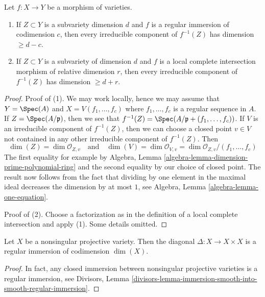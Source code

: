 \begin{lemma}
\label{lemma-pullback-by-regular-immersion}
Let $f : X \to Y$ be a morphism of varieties.
\begin{enumerate}
\item If $Z \subset Y$ is a subvariety dimension $d$ and $f$ is a regular
immersion of codimension $c$, then every irreducible component
of $f^{-1}(Z)$ has dimension $\geq d - c$.
\item If $Z \subset Y$ is a subvariety of dimension $d$ and
$f$ is a local complete intersection morphism of relative dimension $r$,
then every irreducible component of $f^{-1}(Z)$ has dimension $\geq d + r$.
\end{enumerate}
\end{lemma}

\begin{proof}
Proof of (1). We may work locally, hence we may assume that
$Y = \Spec(A)$ and $X = V(f_1, \ldots, f_c)$ where $f_1, \ldots, f_c$
is a regular sequence in $A$. If $Z = \Spec(A/\mathfrak p)$, then
we see that $f^{-1}(Z) = \Spec(A/\mathfrak p + (f_1, \ldots, f_c))$.
If $V$ is an irreducible component of $f^{-1}(Z)$, then we can
choose a closed point $v \in V$ not contained in any other irreducible
component of $f^{-1}(Z)$. Then
$$
\dim(Z) = \dim \mathcal{O}_{Z, v}
\quad\text{and}\quad
\dim(V) = \dim \mathcal{O}_{V, v} = \dim \mathcal{O}_{Z, v}/(f_1, \ldots, f_c)
$$
The first equality for example by
Algebra, Lemma \ref{algebra-lemma-dimension-prime-polynomial-ring}
and the second equality by our choice of closed point.
The result now follows from the fact that dividing by one element
in the maximal ideal decreases the dimension by at most $1$, see
Algebra, Lemma \ref{algebra-lemma-one-equation}.

\medskip\noindent
Proof of (2). Choose a factorization as in the definition of a
local complete intersection and apply (1). Some details omitted.
\end{proof}

\begin{lemma}
\label{lemma-diagonal-regular-immersion}
Let $X$ be a nonsingular projective variety. Then the diagonal
$\Delta : X \to X \times X$ is a regular immersion of codimension $\dim(X)$.
\end{lemma}

\begin{proof}
In fact, any closed immersion between nonsingular projective
varieties is a regular immersion, see Divisors,
Lemma \ref{divisors-lemma-immersion-smooth-into-smooth-regular-immersion}.
\end{proof}

